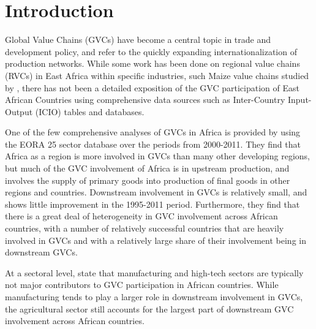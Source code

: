 \documentclass[a4paper]{article}
\begin{document}
\newpage
\tableofcontents
\newpage
\listoftables
\listoffigures
\newpage

\section{Introduction}

Global Value Chains (GVCs) have become a central topic in trade and development policy, and refer to the quickly expanding internationalization of production networks. While some work has been done on regional value chains (RVCs) in East Africa within specific industries, such Maize value chains studied by \citet{daly2016maize}, there has not been a detailed exposition of the GVC participation of East African Countries using comprehensive data sources such as Inter-Country Input-Output (ICIO) tables and databases. \newline

One of the few comprehensive analyses of GVCs in Africa is provided by \citet{foster2015global} using the EORA 25 sector database over the periods from 2000-2011. %
They find that Africa as a region is more involved in GVCs than many other developing regions, but much of the GVC involvement of Africa is in upstream production, and involves the supply of primary goods into production of final goods in other regions and countries. Downstream involvement in GVCs is relatively small, and shows little improvement in the 1995-2011 period. Furthermore, they find that there is a great deal of heterogeneity in GVC involvement across African countries, with a number of relatively successful countries that are heavily involved in GVCs and with a relatively large share of their involvement being in downstream GVCs. \newline

At a sectoral level, \citet{foster2015global} state that manufacturing and high-tech sectors are typically not major contributors to GVC participation in African countries. While manufacturing tends to play a larger role in downstream involvement in GVCs, the agricultural sector still accounts for the largest part of downstream GVC involvement across African countries. \newline %
\end{document}
